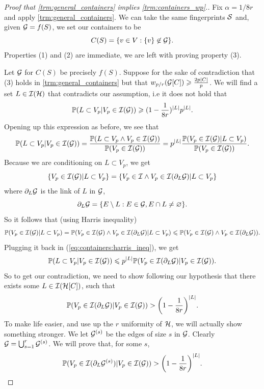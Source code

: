 \begin{proof}[Proof that \ref{trm:general_containers} implies
	\ref{trm:containers_wp}.]
	Fix $\alpha = 1/8r$ and apply \ref{trm:general_containers}.
	We can take the same fingerprints $\mathcal{S}$ and, given $\mathcal{G} = f(S)$, we
	set our containers to be
	\[
		C(S) = \{v \in V : \{v\} \not \in \mathcal{G}\}.
	\]
	Properties (1) and (2) are immediate, we are left with proving property (3).

	Let $\mathcal{G}$ for $C(S)$ be precisely $f(S)$. Suppose for the sake of
	contradiction that (3) holds in \ref{trm:general_containers}
	but that $w_{p/r}(\mathcal{G}[C]) \geqslant \frac{2p|C|}{p}$. We will find a set
	$L \in \mathcal{I}(\mathcal{H})$ that contradicts our assumption, i.e it does not hold
	that
	\[
		\mathbb{P}(L \subset V_p | V_p \in \mathcal{I}(\mathcal{G})) \geqslant (1-\frac{1}{8r})^{|L|}p^{|L|}.
	\]
	Opening up this expression as before, we see that
	\begin{equation}
		\label{eq:containers:harris_ineq}
		\mathbb{P}(L \subset V_p | V_p \in \mathcal{I}(\mathcal{G})) = \frac{\mathbb{P}(L \subset V_p
		\land V_p \in \mathcal{I}(\mathcal{G}))}{\mathbb{P}(V_p \in \mathcal{I}(\mathcal{G}))}
		= p^{|L|}\frac{\mathbb{P}(V_p \in \mathcal{I}(\mathcal{G}) | L \subset V_p)}{\mathbb{P}(V_p \in \mathcal{I}(\mathcal{G}))}.
	\end{equation}
	Because we are conditioning on $L \subset V_p$, we get
	\[
		\{V_p \in \mathcal{I}(\mathcal{G}) | L \subset V_p\} = \{V_p \in \mathcal{I} \land V_p \in
		\mathcal{I}(\partial_L \mathcal{G}) | L \subset V_p\}
	\]
	where $\partial_L \mathcal{G}$ is the link of $L$ in $\mathcal{G}$,
	\[
		\partial_L \mathcal{G} = \{E \setminus L : E \in \mathcal{G}, E \cap L \neq \varnothing\}.
	\]
	So it follows that (using Harris inequality)
	\[
		\mathbb{P}(V_p \in \mathcal{I}(\mathcal{G}) | L \subset V_p) = \mathbb{P}(V_p \in \mathcal{I}(\mathcal{G}) \land
		V_p \in \mathcal{I}(\partial_L\mathcal{G}) | L \subset V_p)
		\leqslant \mathbb{P}(V_p \in \mathcal{I}(\mathcal{G}) \land V_p \in \mathcal{I}(\partial_L \mathcal{G})).
	\]
	Plugging it back in (\ref{eq:containers:harris_ineq}), we get
	\[
		\mathbb{P}(L \subset V_p | V_p \in \mathcal{I}(\mathcal{G})) \leqslant p^{|L|} \mathbb{P}(V_p \in
		\mathcal{I}(\partial_L \mathcal{G}) | V_p \in \mathcal{I}(\mathcal{G})).
	\]
	So to get our contradiction, we need to show following our
	hypothesis that there exists some $L \in \mathcal{I}(\mathcal{H}[C])$,
	such that
	\[
		\mathbb{P}(V_p \in \mathcal{I}(\partial_L \mathcal{G}) | V_p \in \mathcal{I}(\mathcal{G})) > \bigg(1 -
		\frac{1}{8r}\bigg)^{|L|}.
	\]
	To make life easier, and use up the $r$ uniformity of $\mathcal{H}$, we will
	actually show something stronger. We
	let $\mathcal{G}^{(s)}$ be the edges of size $s$ in $\mathcal{G}$. Clearly $\mathcal{G} =
	\bigcup_{s = 1}^r \mathcal{G}^{(s)}$. We will
	prove that, for some $s$,
	\[
		\mathbb{P}(V_p \in \mathcal{I}(\partial_L \mathcal{G}^{(s)}) | V_p \in \mathcal{I}(\mathcal{G})) > \bigg(1
		- \frac{1}{8r}\bigg)^{|L|}.
	\]


\end{proof}
